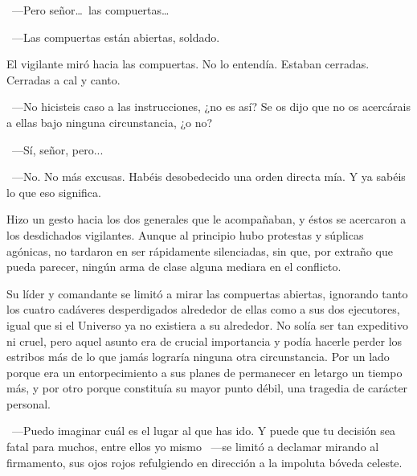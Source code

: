~---Pero señor\dots\ las compuertas\dots

~---Las compuertas están abiertas, soldado.

El vigilante miró hacia las compuertas. No lo entendía. Estaban cerradas. Cerradas a cal y canto.

~---No hicisteis caso a las instrucciones, ¿no es así? Se os dijo que no os acercárais a ellas bajo ninguna circunstancia, ¿o no?

~---Sí, señor, pero...

~---No. No más excusas. Habéis desobedecido una orden directa mía. Y ya sabéis lo que eso significa.

Hizo un gesto hacia los dos generales que le acompañaban, y éstos se acercaron a los desdichados vigilantes. Aunque al principio hubo protestas y súplicas agónicas, no tardaron en ser rápidamente silenciadas, sin que, por extraño que pueda parecer, ningún arma de clase alguna mediara en el conflicto.

Su líder y comandante se limitó a mirar las compuertas abiertas, ignorando tanto los cuatro cadáveres desperdigados alrededor de ellas como a sus dos ejecutores, igual que si el Universo ya no existiera a su alrededor. No solía ser tan expeditivo ni cruel, pero aquel asunto era de crucial importancia y podía hacerle perder los estribos más de lo que jamás lograría ninguna otra circunstancia. Por un lado porque era un entorpecimiento a sus planes de permanecer en letargo un tiempo más, y por otro porque constituía su mayor punto débil, una tragedia de carácter personal.

~---Puedo imaginar cuál es el lugar al que has ido. Y puede que tu decisión sea fatal para muchos, entre ellos yo mismo ~---se limitó a declamar mirando al firmamento, sus ojos rojos refulgiendo en dirección a la impoluta bóveda celeste.

\endinput
